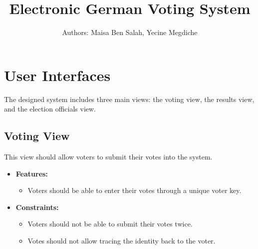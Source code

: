 \documentclass[a4paper]{article}
\title{
Electronic German Voting System  \\
}
\author{
Authors: Maisa Ben Salah, Yecine Megdiche
}
\begin{document}
\maketitle
\section{User Interfaces}
The designed system includes three main views: the voting view, the results view, and the election officials view.
\subsection{Voting View}
This view should allow voters to submit their votes into the system.
\begin{itemize}
    \item \textbf{Features:}
    \begin{itemize}
        \item Voters should be able to enter their votes through a unique voter key.
    \end{itemize}
    \item \textbf{Constraints:}
        \begin{itemize}
        \item Voters should not be able to submit their votes twice.
        \item Votes should not allow tracing the identity back to the voter.
    \end{itemize}
\end{itemize}
\end{document}
